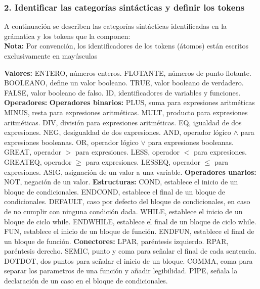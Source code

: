 \documentclass[12pt]{article}
\begin{document}
\subsubsection*{2. Identificar las categorías sintácticas y definir los tokens}
A continuación se describen las categorías sintácticas identificadas en la grámatica y los tokens que la componen:\\
\textbf{Nota:} Por convención, los identificadores de los tokens (átomos) están escritos exclusivamente en mayúsculas 
\begin{outline}
\1 \textbf{Valores:}
	\2 ENTERO, números enteros.
    \2 FLOTANTE, números de punto flotante.
    \2 BOOLEANO, define un valor booleano.
    \3 TRUE, valor booleano de verdadero.
    \3 FALSE, valor booleano de falso.
    \3 ID, identificadores de variables y funciones.
\1 \textbf{Operadores:}
	\2 \textbf{Operadores binarios:}
		\3 PLUS, suma para expresiones aritméticas
    	\3 MINUS, resta para expresiones aritméticas.
    	\3 MULT, producto para expresiones aritméticas.
    	\3 DIV, división para expresiones aritméticas.
    	\3 EQ, igualdad de dos expresiones.
        \3 NEG, desigualdad de dos expresiones.
    	\3 AND, operador lógico $\land$ para expresiones booleanas.
    	\3 OR, operador lógico $\lor$ para expresiones booleanas.
    	\3 GREAT, operador $>$  para expresiones.
    	\3 LESS, operador $<$ para expresiones.
    	\3 GREATEQ, operador $\geq$ para expresiones.
        \3 LESSEQ, operador $\leq$ para expresiones.
        \3 ASIG, asignación de un valor a una variable.
 	\2 \textbf{Operadores unarios:}
    	\3 NOT, negación de un valor.
 \1 \textbf{Estructuras:}
 	\2 COND, establece el inicio de un bloque de condicionales.
    \2 ENDCOND, establece el final de un bloque de condicionales.
    \2 DEFAULT, caso por defecto del bloque de condicionales, en caso de no cumplir con ninguna condición dada.
    \2 WHILE, establece el inicio de un bloque de ciclo while.
    \2 ENDWHILE, establece el final de un bloque de ciclo while.
    \2 FUN, establece el inicio de un bloque de función.
    \2 ENDFUN, establece el final de un bloque de función.
 \1 \textbf{Conectores:}
 	\2 LPAR, paréntesis izquierdo.
    \2 RPAR, paréntesis derecho.
    \2 SEMIC, punto y coma para señalar el final de cada sentencia.
    \2 DOTDOT, dos puntos para señalar el inicio de un bloque.
    \2 COMMA, coma para separar los parametros de una función y añadir legibilidad.
    \2 PIPE, señala la declaración de un caso en el bloque de condicionales.
\end{outline}
\end{document}
